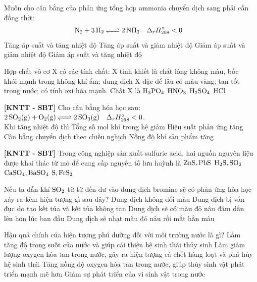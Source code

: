 \documentclass[12pt,a4paper]{article}
\begin{document}
\begin{ex}
Muốn cho cân bằng của phản ứng tổng hợp ammonia chuyển dịch sang phải cần đồng thời:
\[\ce{N2 + 3H2 <=> 2NH3} \quad \Delta_r H^\circ_{298} < 0\]
\choice
{Tăng áp suất và tăng nhiệt độ}
{\True Tăng áp suất và giảm nhiệt độ}
{Giảm áp suất và giảm nhiệt độ}
{Giảm áp suất và tăng nhiệt độ}

\end{ex}

\begin{ex}
Hợp chất vô cơ X có các tính chất: X tinh khiết là chất lỏng không màu, bốc khói mạnh trong không khí ẩm; dung dịch X đặc để lâu có màu vàng; tan tốt trong nước; có tính oxi hóa mạnh. Chất X là
\choice
{$\ce{H3PO4}$}
{\True $\ce{HNO3}$}
{$\ce{H2SO4}$}
{$\ce{HCl}$}

\end{ex}

\begin{ex}
\textbf{[KNTT - SBT]} Cho cân bằng hóa học sau: $\ce{2SO2(g) + O2(g) <=> 2SO3(g)} \quad \Delta_r H^\circ_{298} < 0$.\\
Khi tăng nhiệt độ thì
\choice
{Tổng số mol khí trong hệ giảm}
{Hiệu suất phản ứng tăng}
{\True Cân bằng chuyển dịch theo chiều nghịch}
{Nồng độ khí sản phẩm tăng}

\end{ex}

\begin{ex}
\textbf{[KNTT - SBT]} Trong công nghiệp sản xuất sulfuric acid, hai nguồn nguyên liệu được khai thác từ mỏ để cung cấp nguyên tố lưu huỳnh là
\choice
{$\ce{ZnS, PbS}$}
{$\ce{H2S, SO2}$}
{$\ce{CaSO4, BaSO4}$}
{\True $\ce{S, FeS2}$}

\end{ex}

\begin{ex}
Nếu ta dẫn khí $\ce{SO2}$ từ từ đến dư vào dung dịch bromine sẽ có phản ứng hóa học xảy ra kèm hiện tượng gì sau đây?
\choice
{Dung dịch không đổi màu}
{Dung dịch bị vẩn đục do tạo kết tủa và kết tủa không tan}
{Dung dịch sẽ có màu đỏ nâu đậm dần lên hơn lúc ban đầu}
{\True Dung dịch sẽ nhạt màu đỏ nâu rồi mất hẳn màu}

\end{ex}

\begin{ex}
Hậu quả chính của hiện tượng phú dưỡng đối với môi trường nước là gì?
\choice
{Làm tăng độ trong suốt của nước và giúp cải thiện hệ sinh thái thủy sinh}
{\True Làm giảm lượng oxygen hòa tan trong nước, gây ra hiện tượng cá chết hàng loạt và phá hủy hệ sinh thái}
{Tăng nồng độ oxygen hòa tan trong nước, giúp thủy sinh vật phát triển mạnh mẽ hơn}
{Giảm sự phát triển của vi sinh vật trong nước}

\end{ex}
\end{document}
